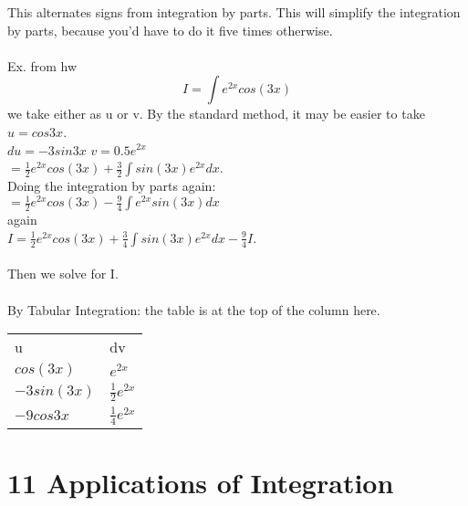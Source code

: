 \documentclass[twocolumn, 12pt]{report}
\begin{document}
  This alternates signs from integration by parts. This will simplify the integration by parts, because you'd have to do it five times otherwise.\\\\
  Ex. from hw $$I = \int e^{2x} cos (3x)$$ we take either as u or v. By the standard method, it may be easier to take $u=cos 3x$.\\ $du= -3sin3x$   $v = 0.5e^{2x}$ \\$= \frac{1}{2}e^{2x}cos(3x) + \frac{3}{2} \int sin(3x)e^{2x}dx$. \\ Doing the integration by parts again:\\ $=\frac{1}{2}e^{2x}cos(3x) - \frac{9}{4} \int e^{2x}sin(3x)dx $ \\ again\\
   $I=\frac{1}{2}e^{2x}cos(3x) + \frac{3}{4} \int sin(3x)e^{2x}dx - \frac{9}{4}I$. \\\\Then we solve for I.\\\\ By Tabular Integration: the table is at the top of the column here.
   \begin{table}[]
 \begin{tabular}{ll}

 u & dv \\
 $cos(3x)$   & $e^{2x}$
               \\ \hline
 $-3sin(3x)$ & $\frac{1}{2}e^{2x}$   \\
 $-9cos3x$   & $\frac{1}{4}e^{2x}$
 \end{tabular}
 \end{table}

 \section{11 Applications of Integration}
\end{document}
